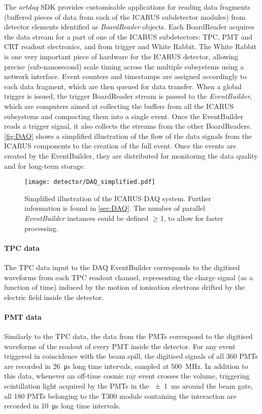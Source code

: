 The \emph{artdaq} SDK provides  customisable applications for reading data fragments (buffered pieces of data from each of the ICARUS subdetector modules) from detector elements identified as \emph{BoardReader} objects. Each BoardReader acquires the data stream for a part of one of the ICARUS subdetectors: TPC, PMT and CRT readout electronics, and from trigger and White Rabbit. 
The White Rabbit is one very important piece of hardware for the ICARUS detector, allowing precise (sub-nanosecond) scale timing across the multiple subsystems using a network interface. 
Event counters and timestamps are assigned accordingly to each data fragment, which are then queued for data transfer. 
When a global trigger is issued, the trigger BoardReader stream is passed to the \emph{EventBuilder}, which are computers aimed at collecting the buffers from all the ICARUS subsystems and compacting them into a single event. Once the EventBuilder reads a trigger signal, it also collects the streams from the other BoardReaders.  \autoref{fig:DAQ} shows a simplified illustration of the flow of the data signals from the ICARUS components to the creation of the full event. Once the events are created by the EventBuilder, they are distributed for monitoring the data quality and for long-term storage. 

\begin{figure}
    \centering
    \texttt{[image: detector/DAQ\_simplified.pdf]}
    \caption[ICARUS DAQ illustration]{Simplified illustration of the ICARUS DAQ system. Further information is found in \autoref{sec:DAQ}. The number of parallel \emph{EventBuilder} instances could be defined $\geq1$, to allow for faster processing.}
    \label{fig:DAQ}
\end{figure}

\paragraph{TPC data} The TPC data input to the DAQ EventBuilder corresponds to the digitised waveforms from each TPC readout channel, representing the charge signal (as a function of time) induced by the motion of ionisation electrons drifted by the electric field inside the detector. 

\paragraph{PMT data} Similarly to the TPC data, the data from the PMTs correspond to the digitised waveforms of the readout of every PMT inside the detector. For any event triggered in coincidence with the beam spill, the digitised signals of all 360 PMTs are recorded in \SI{26}{\us} long time intervals, sampled at \SI{500}{\mega\hertz}. In addition to this data, whenever an off-time cosmic ray event crosses the volume, triggering scintillation light acquired by the PMTs in the \SI{+-1}{\ms} around the beam gate, all 180 PMTs belonging to the T300 module containing the interaction are recorded in \SI{10}{\us} long time intervals. 

